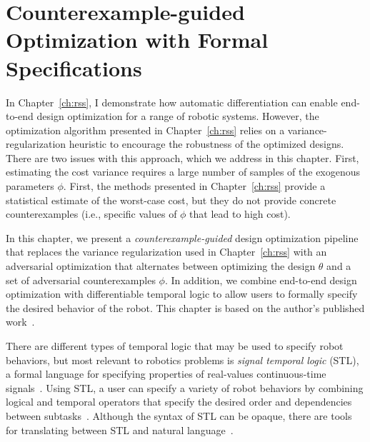 \newcommand{\ieeecopyright}{\copyright 2022 IEEE}

\chapter{Counterexample-guided Optimization with Formal Specifications}\label{ch:iros}

In Chapter~\ref{ch:rss}, I demonstrate how automatic differentiation can enable end-to-end design optimization for a range of robotic systems. However, the optimization algorithm presented in Chapter~\ref{ch:rss} relies on a variance-regularization heuristic to encourage the robustness of the optimized designs. There are two issues with this approach, which we address in this chapter. First, estimating the cost variance requires a large number of samples of the exogenous parameters $\phi$. First, the methods presented in Chapter~\ref{ch:rss} provide a statistical estimate of the worst-case cost, but they do not provide concrete counterexamples (i.e., specific values of $\phi$ that lead to high cost).

In this chapter, we present a \textit{counterexample-guided} design optimization pipeline that replaces the variance regularization used in Chapter~\ref{ch:rss} with an adversarial optimization that alternates between optimizing the design $\theta$ and a set of adversarial counterexamples $\phi$. In addition, we combine end-to-end design optimization with differentiable temporal logic to allow users to formally specify the desired behavior of the robot. This chapter is based on the author's published work~\cite{dawsonRobustCounterexampleguidedOptimization2022b}.

There are different types of temporal logic that may be used to specify robot behaviors, but most relevant to robotics problems is \textit{signal temporal logic} (STL), a formal language for specifying properties of real-values continuous-time signals~\cite{donzeBreachToolboxVerification2010,sunMultiagentMotionPlanning2022,pantSmoothOperatorControl2017}. Using STL, a user can specify a variety of robot behaviors by combining logical and temporal operators that specify the desired order and dependencies between subtasks~\cite{plakuMotionPlanningTemporallogic2016,sunMultiagentMotionPlanning2022,takanoContinuousOptimizationBasedTask2021}. Although the syntax of STL can be opaque, there are tools for translating between STL and natural language~\cite{chenNL2TLTransformingNatural2023}.

